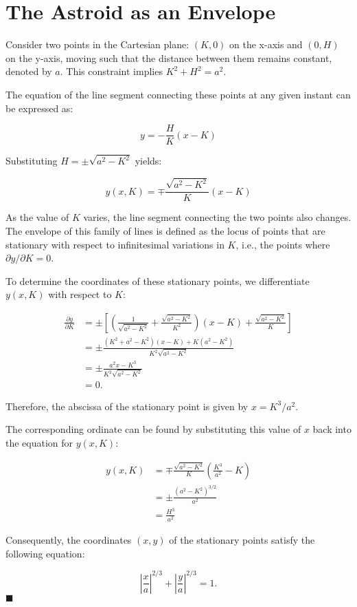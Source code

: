 \documentclass[twocolumn]{article}
\begin{document}
\appendix
\newcommand{\pd}[2]{\frac{\partial #1}{\partial #2}} %
\newcommand{\ilpd}[2]{{\partial #1}/{\partial #2}}
\section*{The Astroid as an Envelope}

Consider two points in the Cartesian plane: $(K, 0)$ on the x-axis and $(0, H)$ on the y-axis, moving such that the distance between them remains constant, denoted by $a$. This constraint implies $K^2 + H^2 = a^2$. 

The equation of the line segment connecting these points at any given instant can be expressed as:

\begin{equation*}
	y = -\frac{H}{K}(x-K)
\end{equation*}

Substituting $H = \pm \sqrt{a^2 - K^2}$ yields:

\begin{equation*}
	y(x, K) = \mp \frac{\sqrt{a^2 - K^2}}{K}(x-K)
\end{equation*}

As the value of $K$ varies, the line segment connecting the two points also changes. The envelope of this family of lines is defined as the locus of points that are stationary with respect to infinitesimal variations in $K$, i.e., the points where $\ilpd{y}{K} = 0$. 

To determine the coordinates of these stationary points, we differentiate $y(x, K)$ with respect to $K$:

\begin{align*}
	\pd{y}{K} &= \pm \left[ \left( \frac{1}{\sqrt{a^2 - K^2}} + \frac{\sqrt{a^2 - K^2}}{K^2} \right)(x-K) + \frac{\sqrt{a^2 - K^2}}{K} \right] \\
	&= \pm \frac{(K^2 + a^2 - K^2)(x-K) + K(a^2 - K^2)}{K^2 \sqrt{a^2 - K^2}} \\
	&= \pm \frac{a^2 x - K^3}{K^2 \sqrt{a^2 - K^2}} \\
	&= 0. 
\end{align*}

Therefore, the abscissa of the stationary point is given by $x = K^3/a^2$. 

The corresponding ordinate can be found by substituting this value of $x$ back into the equation for $y(x, K)$:

\begin{align*}
	y(x, K) &= \mp \frac{\sqrt{a^2 - K^2}}{K} \left( \frac{K^3}{a^2} - K \right) \\
	&= \pm \frac{(a^2 - K^2)^{3/2}}{a^2} \\
	&= \frac{H^3}{a^2}
\end{align*}

Consequently, the coordinates $(x, y)$ of the stationary points satisfy the following equation:

\begin{equation*}
	\left| \frac{x}{a} \right|^{2/3} + \left| \frac{y}{a} \right|^{2/3} = 1.
\end{equation*}
$\blacksquare$
\end{document}
